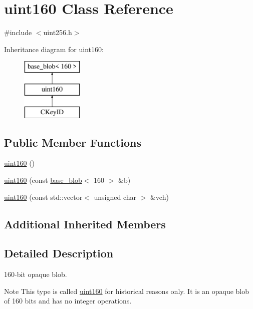\hypertarget{classuint160}{}\section{uint160 Class Reference}
\label{classuint160}


{\ttfamily \#include $<$uint256.\+h$>$}

Inheritance diagram for uint160\+:\begin{figure}[H]
\begin{center}
\leavevmode
\includegraphics[height=3.000000cm]{classuint160}
\end{center}
\end{figure}
\subsection*{Public Member Functions}
\begin{DoxyCompactItemize}
\item 
\mbox{\hyperlink{classuint160_a66918f25b891415f2a9bbbb1dfdbedbd}{uint160}} ()
\item 
\mbox{\hyperlink{classuint160_aafc05eec384bffea281460902ad40d8d}{uint160}} (const \mbox{\hyperlink{classbase__blob}{base\+\_\+blob}}$<$ 160 $>$ \&b)
\item 
\mbox{\hyperlink{classuint160_a92bd85c77e73d6642f9bb7519cbd480c}{uint160}} (const std\+::vector$<$ unsigned char $>$ \&vch)
\end{DoxyCompactItemize}
\subsection*{Additional Inherited Members}


\subsection{Detailed Description}
160-\/bit opaque blob. \begin{DoxyNote}{Note}
This type is called \mbox{\hyperlink{classuint160}{uint160}} for historical reasons only. It is an opaque blob of 160 bits and has no integer operations. 
\end{DoxyNote}


